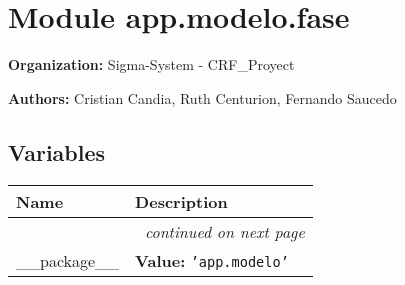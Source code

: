 %
%
%


\section{Module app.modelo.fase}

    \label{app:modelo:fase}
\textbf{Organization:} Sigma-System - CRF\_Proyect



\textbf{Authors:}
Cristian Candia,
    Ruth Centurion,
    Fernando Saucedo



  \subsection{Variables}

    \vspace{-1cm}
\hspace{\varindent}\begin{longtable}{|p{\varnamewidth}|p{\vardescrwidth}|l}
\cline{1-2}
\cline{1-2} \centering \textbf{Name} & \centering \textbf{Description}& \\
\cline{1-2}
\endhead\cline{1-2}\multicolumn{3}{r}{\small\textit{continued on next page}}\\\endfoot\cline{1-2}
\endlastfoot\raggedright \_\-\_\-p\-a\-c\-k\-a\-g\-e\-\_\-\_\- & \raggedright \textbf{Value:} 
{\tt \texttt{'}\texttt{app.modelo}\texttt{'}}&\\
\cline{1-2}
\end{longtable}



